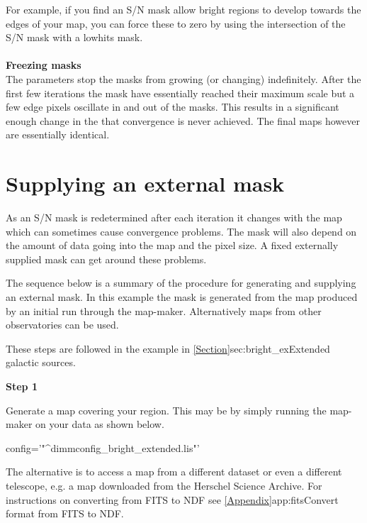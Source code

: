 \documentclass[11pt,oneside,chapters]{starlink}
\begin{document}
For example, if you find an S/N mask allow bright regions to develop
towards the edges of your map, you can force these to zero by using
the intersection of the S/N mask with a lowhits mask.
\\\\
\textbf{Freezing masks}\\
The  parameters stop the masks from growing
(or changing) indefinitely. After the first few iterations the mask
have essentially reached their maximum scale but a few edge pixels
oscillate in and out of the masks. This results in a significant enough
change in the  that convergence is never achieved. The
final maps however are essentially identical.


\section{Supplying an external mask}
\label{sec:maskbe}

As an S/N mask is redetermined after each iteration it changes with the map
 which can sometimes cause convergence problems. The mask
will also depend on the amount of data going into the map and the
pixel size. A fixed externally supplied mask  can get around these problems.

The sequence below is a summary of the procedure for generating and
supplying an external mask. In this example the mask is generated from
the map produced by an initial run through the map-maker.
Alternatively maps from other observatories can be used.

These steps are followed in the example in
\cref{Section}{sec:bright_ex}{Extended galactic sources}.

\begin{minipage}[t]{0.1\linewidth}
\textbf{Step 1}
\end{minipage}
\begin{minipage}[t]{0.9\linewidth}Generate a map covering your region. This
may be by simply running the map-maker on your data as shown below.
\begin{terminalv}
config='"^dimmconfig_bright_extended.lis"'
\end{terminalv}
The alternative is to access a map from a different dataset or even a
different telescope, e.g. a map downloaded from the Herschel Science
Archive. For instructions on converting from FITS to NDF see
\cref{Appendix}{app:fits}{Convert format from FITS to NDF}.\\
\end{minipage}
\end{document}
